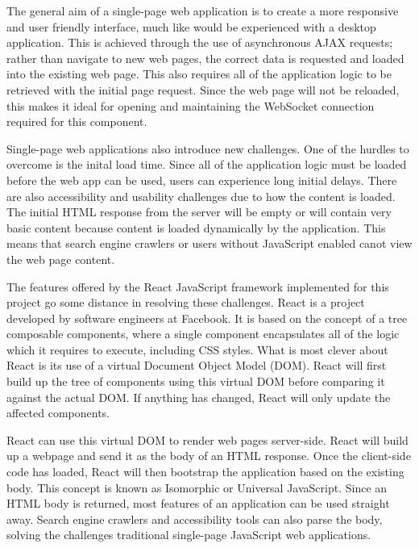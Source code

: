       The general aim of a single-page web application is to create a more responsive and user friendly interface, much like would be experienced with a desktop application. This is achieved through the use of asynchronous AJAX requests; rather than navigate to new web pages, the correct data is requested and loaded into the existing web page. This also requires all of the application logic to be retrieved with the initial page request. Since the web page will not be reloaded, this makes it ideal for opening and maintaining the WebSocket connection required for this component.

      Single-page web applications also introduce new challenges. One of the hurdles to overcome is the inital load time. Since all of the application logic must be loaded before the web app can be used, users can experience long initial delays. There are also accessibility and usability challenges due to how the content is loaded. The initial HTML response from the server will be empty or will contain very basic content because content is loaded dynamically by the application. This means that search engine crawlers or users without JavaScript enabled canot view the web page content.

      The features offered by the React JavaScript framework implemented for this project go some distance in resolving these challenges. React is a project developed by software engineers at Facebook. It is based on the concept of a tree composable components, where a single component encapsulates all of the logic which it requires to execute, including CSS styles. What is most clever about React is its use of a virtual Document Object Model (DOM). React will first build up the tree of components using this virtual DOM before comparing it against the actual DOM. If anything has changed, React will only update the affected components.

      React can use this virtual DOM to render web pages server-side. React will build up a webpage and send it as the body of an HTML response. Once the client-side code has loaded, React will then bootstrap the application based on the existing body. This concept is known as Isomorphic or Universal JavaScript. Since an HTML body is returned, most features of an application can be used straight away. Search engine crawlers and accessibility tools can also parse the body, solving the challenges traditional single-page JavaScript web applications.

